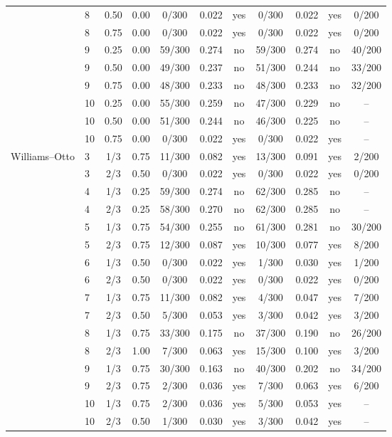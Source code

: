 \begin{table}[p]
\begin{tabular}{llcc ccc ccc c}
 & 8 & 0.50 & 0.00 & 0/300 & 0.022 & yes & 0/300 & 0.022 & yes & 0/200 \\
 & 8 & 0.75 & 0.00 & 0/300 & 0.022 & yes & 0/300 & 0.022 & yes & 0/200 \\
 & 9 & 0.25 & 0.00 & 59/300 & 0.274 & no & 59/300 & 0.274 & no & 40/200 \\
 & 9 & 0.50 & 0.00 & 49/300 & 0.237 & no & 51/300 & 0.244 & no & 33/200 \\
 & 9 & 0.75 & 0.00 & 48/300 & 0.233 & no & 48/300 & 0.233 & no & 32/200 \\
 & 10 & 0.25 & 0.00 & 55/300 & 0.259 & no & 47/300 & 0.229 & no & -- \\
 & 10 & 0.50 & 0.00 & 51/300 & 0.244 & no & 46/300 & 0.225 & no & -- \\
 & 10 & 0.75 & 0.00 & 0/300 & 0.022 & yes & 0/300 & 0.022 & yes & -- \\
\addlinespace[3pt]
Williams--Otto & 3 & 1/3 & 0.75 & 11/300 & 0.082 & yes & 13/300 & 0.091 & yes & 2/200 \\
 & 3 & 2/3 & 0.50 & 0/300 & 0.022 & yes & 0/300 & 0.022 & yes & 0/200 \\
 & 4 & 1/3 & 0.25 & 59/300 & 0.274 & no & 62/300 & 0.285 & no & -- \\
 & 4 & 2/3 & 0.25 & 58/300 & 0.270 & no & 62/300 & 0.285 & no & -- \\
 & 5 & 1/3 & 0.75 & 54/300 & 0.255 & no & 61/300 & 0.281 & no & 30/200 \\
 & 5 & 2/3 & 0.75 & 12/300 & 0.087 & yes & 10/300 & 0.077 & yes & 8/200 \\
 & 6 & 1/3 & 0.50 & 0/300 & 0.022 & yes & 1/300 & 0.030 & yes & 1/200 \\
 & 6 & 2/3 & 0.50 & 0/300 & 0.022 & yes & 0/300 & 0.022 & yes & 0/200 \\
 & 7 & 1/3 & 0.75 & 11/300 & 0.082 & yes & 4/300 & 0.047 & yes & 7/200 \\
 & 7 & 2/3 & 0.50 & 5/300 & 0.053 & yes & 3/300 & 0.042 & yes & 3/200 \\
 & 8 & 1/3 & 0.75 & 33/300 & 0.175 & no & 37/300 & 0.190 & no & 26/200 \\
 & 8 & 2/3 & 1.00 & 7/300 & 0.063 & yes & 15/300 & 0.100 & yes & 3/200 \\
 & 9 & 1/3 & 0.75 & 30/300 & 0.163 & no & 40/300 & 0.202 & no & 34/200 \\
 & 9 & 2/3 & 0.75 & 2/300 & 0.036 & yes & 7/300 & 0.063 & yes & 6/200 \\
 & 10 & 1/3 & 0.75 & 2/300 & 0.036 & yes & 5/300 & 0.053 & yes & -- \\
 & 10 & 2/3 & 0.50 & 1/300 & 0.030 & yes & 3/300 & 0.042 & yes & -- \\
\bottomrule
\end{tabular}
\end{table}
